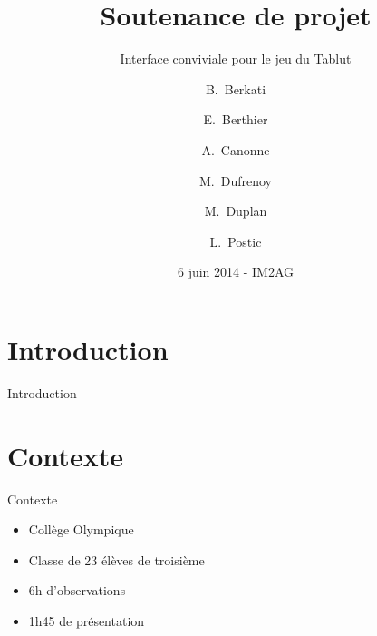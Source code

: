 \documentclass{beamer}
\title[UE PROG6] %
{Soutenance de projet}
\subtitle
{Interface conviviale pour le jeu du Tablut} %
\author[] %
{B.~Berkati \and E.~Berthier \and A.~Canonne \and M.~Dufrenoy \and M.~Duplan \and L.~Postic}
\institute[Universities of Somewhere and Elsewhere] %
{
  IM2AG - Département STS Informatique\\
  Université Joseph Fourier
 }
\date[UET Animation scientifique] %
{6 juin 2014 - IM2AG}
\begin{document}
\begin{frame}
  \titlepage
\end{frame}






\section{Introduction}

\begin{frame}{Introduction}
  \tableofcontents
\end{frame}

\section{Contexte}

\begin{frame}{Contexte}
  \begin{itemize}
  	\item Collège Olympique
	\item Classe de 23 élèves de troisième
	\item 6h d'observations
	\item 1h45 de présentation
  \end{itemize}
\end{frame}
\end{document}

